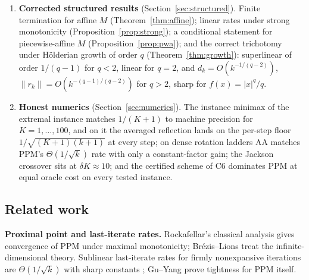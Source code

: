 \documentclass[11pt]{article}
\theoremstyle{definition}
\theoremstyle{remark}
\newcommand{\norm}[1]{\| #1 \|}
\newcommand{\abs}[1]{| #1 |}
\begin{document}
\begin{enumerate}[label=\textbf{C\arabic*.},leftmargin=3.2em]
      residuals (Proposition~\ref{prop:nohist})---so the factor two is
      optimal (Corollary~\ref{cor:optimal2}). On linear problems the
      safeguarding cost vanishes by C1.
\item \textbf{Corrected structured results} (Section~\ref{sec:structured}).
      Finite termination for affine $M$ (Theorem~\ref{thm:affine}); linear
      rates under strong monotonicity (Proposition~\ref{prop:strong}); a
      conditional statement for piecewise-affine $M$
      (Proposition~\ref{prop:pwa}); and the correct trichotomy under
      H\"olderian growth of order $q$ (Theorem~\ref{thm:growth}):
      superlinear of order $1/(q-1)$ for $q<2$, linear for $q=2$, and
      $d_k=O(k^{-1/(q-2)})$, $\norm{r_k}=O(k^{-(q-1)/(q-2)})$ for $q>2$,
      sharp for $f(x)=\abs{x}^q/q$.
\item \textbf{Honest numerics} (Section~\ref{sec:numerics}). The instance
      minimax of the extremal instance matches $1/(K+1)$ to machine
      precision for $K=1,\dots,100$, and on it the averaged reflection
      lands on the per-step floor $1/\sqrt{(K+1)(k+1)}$ at every step;
      on dense rotation ladders AA matches PPM's $\Theta(1/\sqrt{k})$
      rate with only a constant-factor gain; the Jackson crossover sits
      at $\delta K\approx10$; and the certified scheme of C6 dominates
      PPM at equal oracle cost on every tested instance.
\end{enumerate}

\subsection{Related work}

\textbf{Proximal point and last-iterate rates.} Rockafellar's classical
analysis \cite{rockafellar1976mono,rockafellar1976aug} gives convergence of
PPM under maximal monotonicity; Br\'ezis--Lions \cite{brezis1978produits}
treat the infinite-dimensional theory. Sublinear last-iterate rates for
firmly nonexpansive iterations are $\Theta(1/\sqrt{k})$ with sharp constants
\cite{bravo2019sharp,cominetti2014rates,contreras2022optimal}; Gu--Yang
\cite{guyang2020tight} prove tightness for PPM itself.
\end{document}
